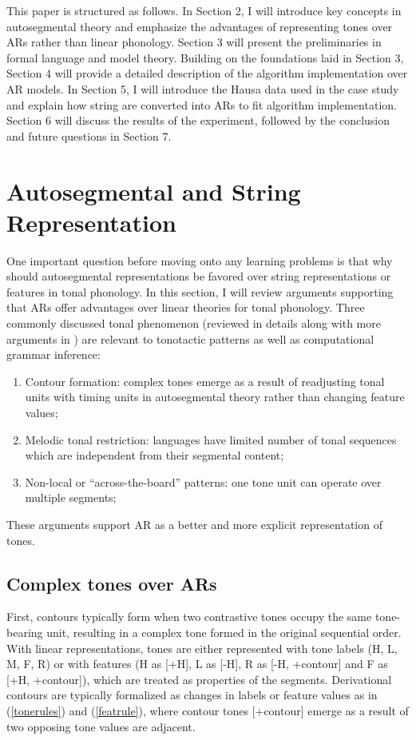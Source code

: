 \documentclass[11pt,letterpaper]{article}
\begin{document}
This paper is structured as follows. In Section 2, I will introduce key concepts in autosegmental theory and emphasize the advantages of representing tones over ARs rather than linear phonology. Section 3 will present the preliminaries in formal language and model theory. Building on the foundations laid in Section 3, Section 4 will provide a detailed description of the algorithm implementation over AR models. In Section 5, I will introduce the Hausa data used in the case study and explain how string are converted into ARs to fit algorithm implementation. Section 6 will discuss the results of the experiment, followed by the conclusion and future questions in Section 7.


\section{Autosegmental and String Representation }
One important question before moving onto any learning problems is that why should autosegmental representations be favored over string representations or features in tonal phonology. In this section, I will review arguments supporting that ARs offer advantages over linear theories for tonal phonology. Three commonly discussed tonal phenomenon (reviewed in details along with more arguments in \citet{oddenbook}) are relevant to tonotactic patterns as well as computational grammar inference:
\begin{enumerate}
\item Contour formation: complex tones emerge as a result of readjusting tonal units with timing units in autosegmental theory rather than changing feature values;
\item Melodic tonal restriction: languages have limited number of tonal sequences which are independent from their segmental content;
\item Non-local or ``across-the-board'' patterns: one tone unit can operate over multiple segments; 

\end{enumerate}

These arguments support AR as a better and more explicit representation of tones. 


\subsection{Complex tones over ARs}
First, contours typically form when two contrastive tones occupy the same tone-bearing unit, resulting in a complex tone formed in the original sequential order. With linear representations, tones are either represented with tone labels (H, L, M, F, R) or with features (H as [+H], L as [-H],  R as [-H, +contour] and F as [+H, +contour]), which are treated as properties of the segments. Derivational contours are typically formalized as changes in labels or feature values as in (\ref{tonerules}) and (\ref{featrule}), where contour tones [+contour] emerge as a result of two opposing tone values are adjacent.
\end{document}
